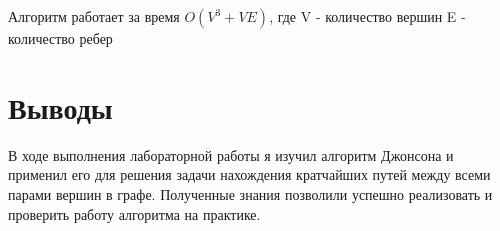 \documentclass[12pt]{article}
\begin{document}
Алгоритм работает за время $O(V^3 + VE)$, где V - количество вершин E - количество ребер



\newpage
\section*{Выводы}
В ходе выполнения лабораторной работы я изучил алгоритм Джонсона и применил его для решения задачи нахождения кратчайших путей между всеми парами вершин в графе. Полученные знания позволили успешно реализовать и проверить работу алгоритма на практике.
\end{document}
